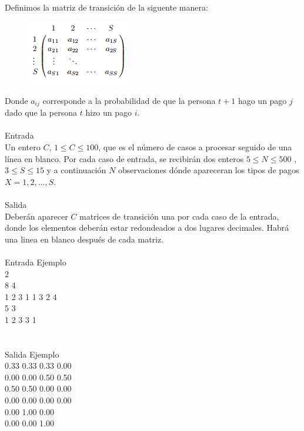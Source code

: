 \documentclass[12pt]{article}
\begin{document}
\\Definimos la matriz de transición de la siguente manera:\\
\begin{figure}[h!] 
\begin{center} 
\includegraphics[scale = 0.67]{ma.PNG}\hspace{50mm}  
\end{center} 
\end{figure}
Donde $a_{ij}$ corresponde a la probabilidad de que la persona $t + 1$ hago un pago $j$ dado que la persona $t$ hizo un pago $i$.
\\
\\
\textrm{\large Entrada}
\\
Un entero $C$, $1 ≤ C ≤ 100$, que es el número de casos a procesar seguido de una línea en blanco. Por cada caso de entrada, se recibirán dos enteros $5 ≤ N ≤ 500$ , $3 ≤ S ≤ 15$ y a continuación $N$ observaciones dónde apareceran los tipos de pagos $X = {1, 2, . . . , S}$.
\\
\\
\textrm{\large Salida}
\\
Deberán aparecer $C$ matrices de transición una por cada caso de la entrada, donde los elementos deberán estar redondeados a dos lugares decimales. Habrá una linea en blanco después de cada matriz.
\\
\\
\textrm{\large Entrada Ejemplo}
\\
2\\
8 4\\
1 2 3 1 1 3 2 4\\
5 3\\
1 2 3 3 1\\
\\
\\
\textrm{\large Salida Ejemplo}
\\
0.33 0.33 0.33 0.00\\
0.00 0.00 0.50 0.50\\
0.50 0.50 0.00 0.00\\
0.00 0.00 0.00 0.00\\
0.00 1.00 0.00\\
0.00 0.00 1.00\\
\end{document}
